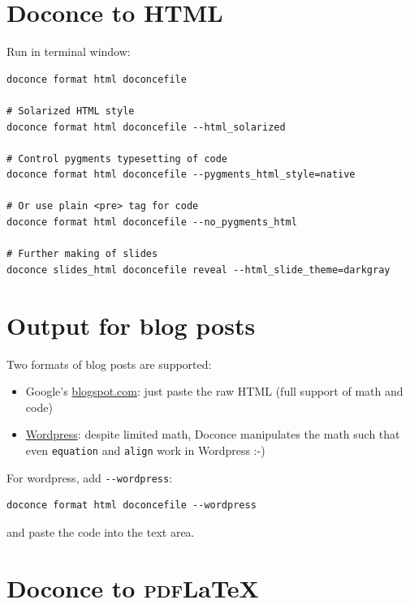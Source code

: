 \documentclass[%
twoside,                 %
final,                   %
chapterprefix=true,      %
open=right               %
10pt]{book}
\newcounter{doconce:movie:counter}
\newcounter{doconce:exercise:counter}
\begin{document}
\noindent


\section*{Doconce to HTML}

Run in terminal window:
\begin{Verbatim}[numbers=none,fontsize=\fontsize{9pt}{9pt},baselinestretch=0.95]
doconce format html doconcefile

# Solarized HTML style
doconce format html doconcefile --html_solarized

# Control pygments typesetting of code
doconce format html doconcefile --pygments_html_style=native

# Or use plain <pre> tag for code
doconce format html doconcefile --no_pygments_html

# Further making of slides
doconce slides_html doconcefile reveal --html_slide_theme=darkgray
\end{Verbatim}

\section*{Output for blog posts}

Two formats of blog posts are supported:

\begin{itemize}
 \item Google's \href{{http://doconce-report-demo.blogspot.no/}}{blogspot.com}:
   just paste the raw HTML (full support of math and code)

 \item \href{{http://doconcereportdemo.wordpress.com/}}{Wordpress}:
   despite limited math, Doconce manipulates the math
   such that even \Verb!equation! and \Verb!align! work in Wordpress :-)
\end{itemize}

\noindent
For wordpress, add \Verb!--wordpress!:
\begin{Verbatim}[numbers=none,fontsize=\fontsize{9pt}{9pt},baselinestretch=0.95]
doconce format html doconcefile --wordpress
\end{Verbatim}
and paste the code into the text area.



\section*{Doconce to \textsc{pdf}{\LaTeX}}
\end{document}
